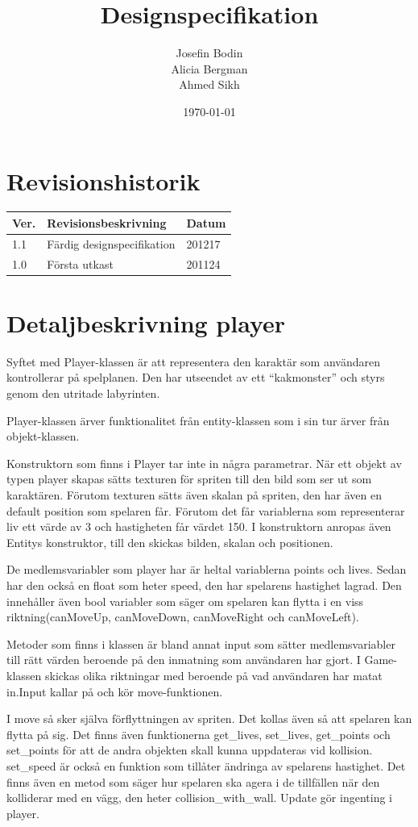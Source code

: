 \documentclass{TDP005mall}
\author{Josefin Bodin\\
  Alicia Bergman\\
Ahmed Sikh}
\title{Designspecifikation}
\date{\today}
\begin{document}
\projectpage
\section{Revisionshistorik}
\begin{table}[!h]
\begin{tabularx}{\linewidth}{|l|X|l|}
\hline
Ver. & Revisionsbeskrivning & Datum \\\hline
1.1 & Färdig designspecifikation & 201217 \\\hline
1.0 & Första utkast & 201124 \\\hline
\end{tabularx}
\end{table}


\section{Detaljbeskrivning player}

Syftet med Player-klassen är att representera den karaktär som användaren
kontrollerar på spelplanen.  Den har utseendet av ett “kakmonster” och  styrs
genom den utritade labyrinten.

Player-klassen ärver funktionalitet från entity-klassen som i sin tur ärver från
objekt-klassen.


Konstruktorn som finns i Player tar inte in några parametrar. När ett objekt av
typen player skapas sätts texturen för spriten till den bild som ser ut som
karaktären. Förutom texturen sätts även skalan på spriten,
den har även en default position som spelaren får.
Förutom det får variablerna som representerar liv ett värde av 3 och hastigheten
får värdet 150.
I konstruktorn anropas även Entitys konstruktor, till den skickas bilden, skalan och positionen. 

De medlemsvariabler som player har är heltal variablerna points och lives.
Sedan har den också en float som heter speed, den har spelarens hastighet
lagrad.
Den innehåller även bool variabler som säger om spelaren kan flytta i en viss
riktning(canMoveUp, canMoveDown, canMoveRight och canMoveLeft).


Metoder som finns i klassen är bland annat input som sätter medlemsvariabler
till rätt värden beroende på den inmatning som användaren har gjort. I
Game-klassen skickas olika riktningar med beroende på vad användaren har matat
in.Input kallar på och kör move-funktionen.

I move så sker själva förflyttningen av spriten. Det kollas även så att spelaren
kan flytta på sig. Det finns även funktionerna get\_lives, set\_lives,
get\_points och set\_points för att de andra objekten skall kunna uppdateras vid
kollision. set\_speed är också en funktion som tillåter ändringa av spelarens
hastighet. Det finns även en metod som säger hur spelaren ska agera i de tillfällen
när den kolliderar med en vägg, den heter collision\_with\_wall. Update gör
ingenting i player.
\end{document}
